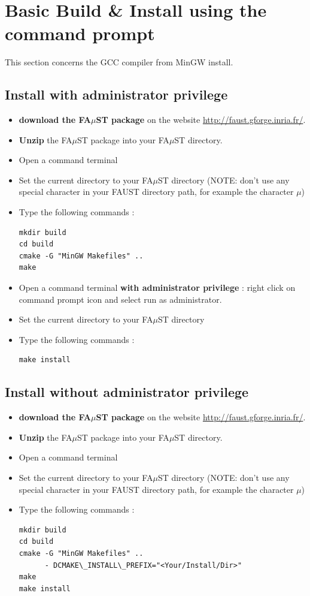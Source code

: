 \section{Basic Build \& Install using the command prompt}
\label{sec:WinMinGWBasicInstall}
This section concerns the GCC compiler from MinGW install.
\subsection{Install with administrator privilege}
\label{sec:WinMinGWadminBasicInstall}
\begin{itemize}
\item \textbf{download the FA$\mu$ST package} on the website  \url{http://faust.gforge.inria.fr/}. 
\item \textbf{Unzip} the FA$\mu$ST package into your FA$\mu$ST directory. 

\item Open a command terminal
\item Set the current directory to your FA$\mu$ST directory (NOTE: don't use any special character in your FAUST directory path, for example the character $\mu$)
\item Type the following commands : 
\begin{lstlisting}
mkdir build
cd build
cmake -G "MinGW Makefiles" .. 
make
\end{lstlisting}

\item Open a command terminal \textbf{with administrator privilege} : right click on command prompt icon and select run as administrator. 
\item Set the current directory to your FA$\mu$ST directory
\item Type the following commands : 
\begin{lstlisting}
make install 
\end{lstlisting}
\end{itemize}

\subsection{Install without administrator privilege}
\label{sec:WinMinGWNoAdminBasicInstall}

\begin{itemize}
\item \textbf{download the FA$\mu$ST package} on the website  \url{http://faust.gforge.inria.fr/}. 
\item \textbf{Unzip} the FA$\mu$ST package into your FA$\mu$ST directory. 

\item Open a command terminal
\item Set the current directory to your FA$\mu$ST directory (NOTE: don't use any special character in your FAUST directory path, for example the character $\mu$)
\item Type the following commands : 
\begin{lstlisting}
mkdir build
cd build
cmake -G "MinGW Makefiles" .. 
	  - DCMAKE\_INSTALL\_PREFIX="<Your/Install/Dir>"
make
make install 
\end{lstlisting}
\end{itemize}


